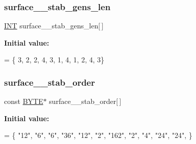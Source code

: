 \subsubsection{\texorpdfstring{surface\+\_\+\_\+stab\+\_\+gens\+\_\+len}{surface\_27\_stab\_gens\_len}}
{\footnotesize\ttfamily \mbox{\hyperlink{galois_8h_a09fddde158a3a20bd2dcadb609de11dc}{I\+NT}} surface\+\_\+\_\+stab\+\_\+gens\+\_\+len\mbox{[}$\,$\mbox{]}}

{\bfseries Initial value\+:}
\begin{DoxyCode}
= \{ 3, 2, 2, 4, 3, 1, 4, 1, 2, 4, 
    3\}
\end{DoxyCode}
\mbox{\label{surface__27_8_c_a6e902798892e70e95c3bf8158a4dd067}} 
\subsubsection{\texorpdfstring{surface\+\_\+\_\+stab\+\_\+order}{surface\_27\_stab\_order}}
{\footnotesize\ttfamily const \mbox{\hyperlink{galois_8h_ab6cc7b4aeb6ea31aba2b3fbfc83ff5e6}{B\+Y\+TE}}$\ast$ surface\+\_\+\_\+stab\+\_\+order\mbox{[}$\,$\mbox{]}}

{\bfseries Initial value\+:}
\begin{DoxyCode}
= \{
    \textcolor{stringliteral}{"12"},
    \textcolor{stringliteral}{"6"},
    \textcolor{stringliteral}{"6"},
    \textcolor{stringliteral}{"36"},
    \textcolor{stringliteral}{"12"},
    \textcolor{stringliteral}{"2"},
    \textcolor{stringliteral}{"162"},
    \textcolor{stringliteral}{"2"},
    \textcolor{stringliteral}{"4"},
    \textcolor{stringliteral}{"24"},
    \textcolor{stringliteral}{"24"},
\}
\end{DoxyCode}
